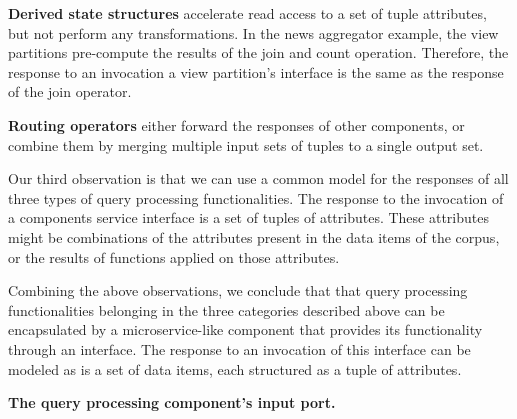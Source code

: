   \medskip
  \noindent
  \textbf{Derived state structures} accelerate read access to a set of tuple attributes,
  but not perform any transformations.
  In the news aggregator example, the view partitions pre-compute the results of the join and count operation.
  Therefore, the response to an invocation a view partition's interface is the same as the response of the join operator.

  \medskip
  \noindent
  \textbf{Routing operators} either forward the responses of other components, or combine them by merging
  multiple input sets of tuples to a single output set.


\bigskip
\noindent
Our third observation is that we can use a common model for the responses of all three types of query processing functionalities.
The response to the invocation of a components service interface is a set of tuples of attributes.
These attributes might be combinations of the attributes present in the data items of the corpus,
or the results of functions applied on those attributes.

\bigskip
\noindent
Combining the above observations,
we conclude that that query processing functionalities belonging in the three categories described above
can be encapsulated by a microservice-like component that provides its functionality through an interface.
The response to an invocation of this interface can be modeled as is a set of data items, each structured as a tuple of attributes.


\vspace{12pt}
\noindent
\textbf{The query processing component's input port.}

